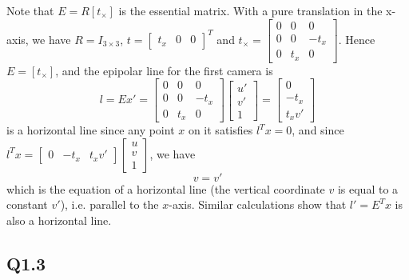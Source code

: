 \documentclass{article} %
\begin{document}
    Note that $E=R\left[t_{\times }\right]$ is the essential matrix. With a pure translation in the x-axis, we have $R=I_{3\times 3}$, $t=\left[\begin{array}{ccc}
    t_{x} & 0 & 0
    \end{array}\right]^{T}$ and $t_{\times }=\left[\begin{array}{ccc}
    0 & 0 & 0\\
    0 & 0 & -t_{x}\\
    0 & t_{x} & 0
    \end{array}\right]$. Hence $E=[t_{\times }]$, and the epipolar line for the first camera is
    \begin{equation*}
    l=Ex'=\left[\begin{array}{ccc}
    0 & 0 & 0\\
    0 & 0 & -t_{x}\\
    0 & t_{x} & 0
    \end{array}\right]\left[\begin{array}{c}
    u'\\
    v'\\
    1
    \end{array}\right]=\left[\begin{array}{c}
    0\\
    -t_{x}\\
    t_{x}v'
    \end{array}\right]
    \end{equation*}
    is a horizontal line since any point $x$ on it satisfies $l^{T}x=0$, and since $l^{T}x=\left[\begin{array}{ccc}
    0 & -t_{x} & t_{x}v'
    \end{array}\right]\left[\begin{array}{c}
    u\\
    v\\
    1
    \end{array}\right]$, we have 
    \begin{equation*}
    v=v'
    \end{equation*}
    which is the equation of a horizontal line (the vertical coordinate $v$ is equal to a constant $v'$), i.e. parallel to the $x$-axis. Similar calculations show that $l'=E^{T}x$ is also a horizontal line.

    \subsection*{Q1.3}
\end{document}
